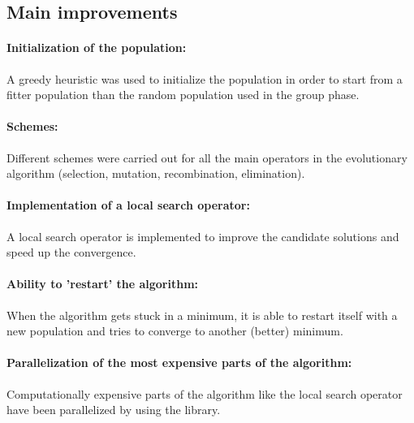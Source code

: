 \documentclass[a4paper,10pt]{article}
\newcommand{\ReplaceMe}[1]{{\color{blue}#1}}
\newcommand{\RemoveMe}[1]{{\color{purple}#1}}
\begin{document}

\subsection{Main improvements}


\paragraph{Initialization of the population:}A greedy heuristic was used to initialize the population in order to start from a fitter population than the random population used in the group phase.

\paragraph{Schemes:} Different schemes were carried out for all the main operators in the evolutionary algorithm (selection, mutation, recombination, elimination).

\paragraph{Implementation of a local search operator:} A local search operator is implemented to improve the candidate solutions and speed up the convergence.

\paragraph{Ability to 'restart' the algorithm:} When the algorithm gets stuck in a minimum, it is able to restart itself with a new population and tries to converge to another (better) minimum.


\paragraph{Parallelization of the most expensive parts of the algorithm:} Computationally expensive parts of the algorithm like the local search operator have been parallelized by using the  library.
\end{document}
